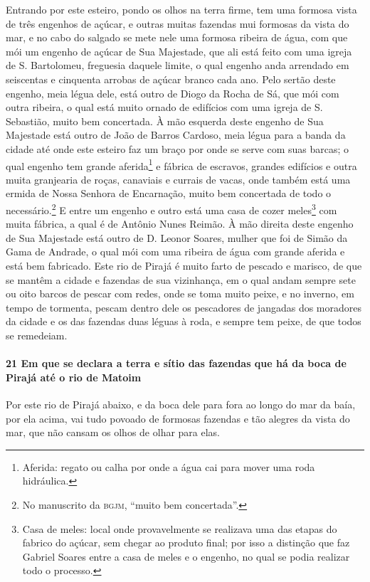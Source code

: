 Entrando por este esteiro, pondo os olhos na terra firme, tem uma formosa vista de três
engenhos de açúcar, e outras muitas fazendas mui formosas da vista do mar, e no cabo do
salgado se mete nele uma formosa ribeira de água, com que mói um engenho de açúcar de Sua
Majestade, que ali está feito com uma igreja de S. Bartolomeu, freguesia daquele limite, o
qual engenho anda arrendado em seiscentas e cinquenta arrobas de açúcar branco cada ano.
Pelo sertão deste engenho, meia légua dele, está outro de Diogo da Rocha de Sá, que mói
com outra ribeira, o qual está muito ornado de edifícios com uma igreja de S. Sebastião,
muito bem concertada. À mão esquerda deste engenho de Sua Majestade está outro de João de
Barros Cardoso, meia légua para a banda da cidade até onde este esteiro faz um braço por
onde se serve com suas barcas; o qual engenho tem grande aferida\footnote{ Aferida: regato
ou calha por onde a água cai para mover uma roda hidráulica.} e fábrica de escravos,
grandes edifícios e outra muita granjearia de roças, canaviais e currais de vacas, onde
também está uma ermida de Nossa Senhora de Encarnação, muito bem concertada de todo o
necessário.\footnote{ No manuscrito da \textsc{bgjm}, ``muito bem concertada''.} E entre
um engenho e outro está uma casa de cozer meles\footnote{ Casa de meles: local onde
provavelmente se realizava uma das etapas do fabrico do açúcar, sem chegar ao produto
final; por isso a distinção que faz Gabriel Soares entre a casa de meles e o engenho, no
qual se podia realizar todo o processo.} com muita fábrica, a qual é de Antônio Nunes
Reimão. À mão direita deste engenho de Sua Majestade está outro de D. Leonor Soares,
mulher que foi de Simão da Gama de Andrade, o qual mói com uma ribeira de água com grande
aferida e está bem fabricado. Este rio de Pirajá é muito farto de pescado e marisco, de
que se mantêm a cidade e fazendas de sua vizinhança, em o qual andam sempre sete ou oito
barcos de pescar com redes, onde se toma muito peixe, e no inverno, em tempo de tormenta,
pescam dentro dele os pescadores de jangadas dos moradores da cidade e os das fazendas
duas léguas à roda, e sempre tem peixe, de que todos se remedeiam.

\paragraph{21 Em que se declara a terra e sítio das fazendas que há da boca de Pirajá até
o rio de Matoim}

Por este rio de Pirajá abaixo, e da boca dele para fora ao longo do mar da baía, por ela
acima, vai tudo povoado de formosas fazendas e tão alegres da vista do mar, que não cansam
os olhos de olhar para elas.

